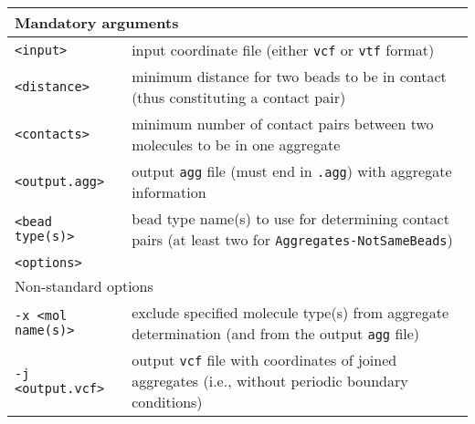 \vspace{1em}
\noindent
\begin{longtable}{p{}p{}}
  \toprule
  \multicolumn{2}{l}{Mandatory arguments} \\
  \midrule
  \texttt{<input>} & input coordinate file (either \texttt{vcf} or
    \texttt{vtf} format) \\
  \texttt{<distance>} & minimum distance for two beads to be in contact
    (thus constituting a contact pair) \\
  \texttt{<contacts>} & minimum number of contact pairs between two
    molecules to be in one aggregate \\
  \texttt{<output.agg>} & output \texttt{agg} file (must end in
    \texttt{.agg}) with aggregate information \\
  \texttt{<bead type(s)>} & bead type name(s) to use for determining
    contact pairs (at least two for \texttt{Aggregates-NotSameBeads}) \\
  \texttt{<options>} & \\
  \toprule
  \multicolumn{2}{l}{Non-standard options} \\
  \midrule
  \texttt{-x <mol name(s)>} & exclude specified molecule type(s) from
    aggregate determination (and from the output \texttt{agg} file) \\
  \texttt{-j <output.vcf>} & output \texttt{vcf} file with coordinates of
    joined aggregates (i.e., without periodic boundary conditions) \\
  \bottomrule
\end{longtable}

